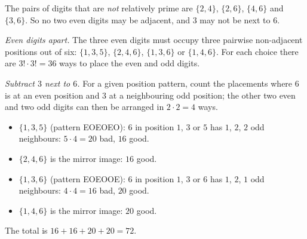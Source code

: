 The pairs of digits that are \emph{not} relatively prime are $\{2,4\}$, $\{2,6\}$, $\{4,6\}$ and $\{3,6\}$. So no two even digits may be adjacent, and $3$ may not be next to $6$.

\emph{Even digits apart.} The three even digits must occupy three pairwise non-adjacent positions out of six: $\{1,3,5\}$, $\{2,4,6\}$, $\{1,3,6\}$ or $\{1,4,6\}$. For each choice there are $3!\cdot3!=36$ ways to place the even and odd digits.

\emph{Subtract $3$ next to $6$.} For a given position pattern, count the placements where $6$ is at an even position and $3$ at a neighbouring odd position; the other two even and two odd digits can then be arranged in $2\cdot2=4$ ways.
\begin{itemize}
\item $\{1,3,5\}$ (pattern EOEOEO): $6$ in position $1$, $3$ or $5$ has $1$, $2$, $2$ odd neighbours: $5\cdot4=20$ bad, $16$ good.
\item $\{2,4,6\}$ is the mirror image: $16$ good.
\item $\{1,3,6\}$ (pattern EOEOOE): $6$ in position $1$, $3$ or $6$ has $1$, $2$, $1$ odd neighbours: $4\cdot4=16$ bad, $20$ good.
\item $\{1,4,6\}$ is the mirror image: $20$ good.
\end{itemize}
The total is $16+16+20+20=\boxed{72}$.
